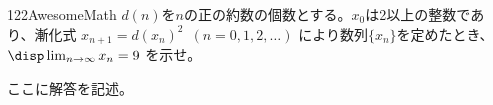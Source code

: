 \begin{thm}{122}{}{AwesomeMath}
 $d(n)$を$n$の正の約数の個数とする。$x_0$は2以上の整数であり、漸化式 $x_{n+1}=d(x_n)^2$~$(n=0, 1, 2, \ldots)$ により数列$\{x_n\}$を定めたとき、$\disp \lim_{n\to\infty} x_n = 9$ を示せ。
\end{thm}

ここに解答を記述。